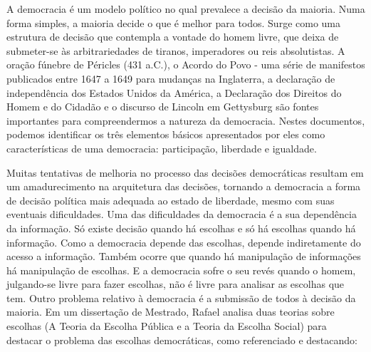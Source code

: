 


A democracia é um modelo político no qual prevalece a decisão da maioria. Numa forma simples, a maioria decide o que é melhor para todos. Surge como uma estrutura de decisão que contempla a vontade do homem livre, que deixa de submeter-se às arbitrariedades de tiranos, imperadores ou reis absolutistas. A oração fúnebre de Péricles (431 a.C.), o Acordo do Povo - uma série de manifestos publicados entre 1647 a 1649 para mudanças na Inglaterra, a declaração de independência dos Estados Unidos da América, a Declaração dos Direitos do Homem e do Cidadão e o discurso de Lincoln em Gettysburg são fontes importantes para compreendermos a natureza da democracia. Nestes documentos, podemos identificar  os três elementos básicos apresentados por eles como características de uma democracia: participação, liberdade e igualdade.

Muitas tentativas de melhoria no processo das decisões democráticas resultam em um amadurecimento na arquitetura das decisões, tornando a democracia a forma de decisão política mais adequada ao estado de liberdade, mesmo com suas eventuais dificuldades. Uma das dificuldades da democracia é a sua dependência da informação. Só existe decisão quando há escolhas e só há escolhas quando há informação. Como a democracia depende das escolhas, depende indiretamente do acesso a informação. Também ocorre que quando há manipulação de informações há manipulação de escolhas. E a democracia sofre o seu revés quando o homem, julgando-se livre para fazer escolhas, não é livre para analisar as escolhas que tem. 
Outro problema relativo à democracia é a submissão de todos à decisão da maioria. Em um dissertação de Mestrado, Rafael  analisa duas teorias sobre escolhas (A Teoria da Escolha Pública e a Teoria da Escolha Social) para destacar o problema das escolhas democráticas, como referenciado e destacando:

